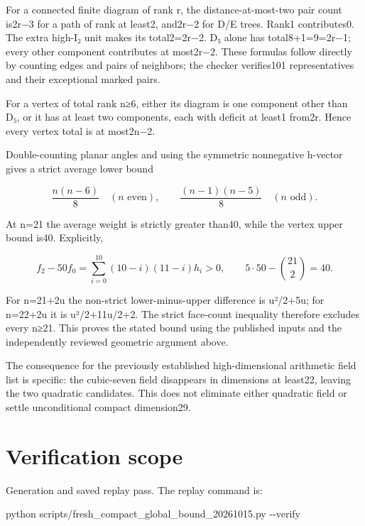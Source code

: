 \documentclass[
  10pt,
]{report}
\newenvironment{Shaded}{}{}
\newcommand{\AttributeTok}[1]{\textcolor[rgb]{0.49,0.56,0.16}{#1}}
\newcommand{\ExtensionTok}[1]{#1}
\newcommand{\NormalTok}[1]{#1}
\begin{document}
For a connected finite diagram of rank r, the distance-at-most-two pair
count is2r−3 for a path of rank at least2, and2r−2 for D/E trees. Rank1
contributes0. The extra high-I₂ unit makes its total2=2r−2. D₅ alone has
total8+1=9=2r−1; every other component contributes at most2r−2. These
formulas follow directly by counting edges and pairs of neighbors; the
checker verifies101 representatives and their exceptional marked pairs.

For a vertex of total rank n≥6, either its diagram is one component
other than D₅, or it has at least two components, each with deficit at
least1 from2r. Hence every vertex total is at most2n−2.

Double-counting planar angles and using the symmetric nonnegative
h-vector gives a strict average lower bound

\[
 \frac{n(n-6)}8\quad(n\text{ even}),\qquad
 \frac{(n-1)(n-5)}8\quad(n\text{ odd}).
\]

At n=21 the average weight is strictly greater than40, while the vertex
upper bound is40. Explicitly,

\[
 f_2-50f_0=\sum_{i=0}^{10}(10-i)(11-i)h_i>0,
 \qquad 5\cdot50-\binom{21}{2}=40.
\]

For n=21+2u the non-strict lower-minus-upper difference is u²/2+5u; for
n=22+2u it is u²/2+11u/2+2. The strict face-count inequality therefore
excludes every n≥21. This proves the stated bound using the published
inputs and the independently reviewed geometric argument above.

The consequence for the previously established high-dimensional
arithmetic field list is specific: the cubic-seven field disappears in
dimensions at least22, leaving the two quadratic candidates. This does
not eliminate either quadratic field or settle unconditional compact
dimension29.

\section{Verification scope}\label{verification-scope}

Generation and saved replay pass. The replay command is:

\begin{Shaded}
\begin{Highlighting}[]
\ExtensionTok{python}\NormalTok{ scripts/fresh\_compact\_global\_bound\_20261015.py }\AttributeTok{{-}{-}verify}
\end{Highlighting}
\end{Shaded}
\end{document}
